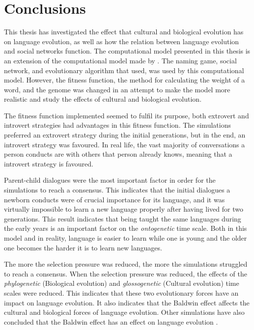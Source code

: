 \acresetall
\chapter{Conclusions}
This thesis has investigated the effect that cultural and biological evolution has on language evolution, as well as how the relation between language evolution and social networks function. The computational model presented in this thesis is an extension of the computational model made by \citet{lekvam2014co}. The naming game, social network, and evolutionary algorithm that \citeauthor{lekvam2014co} used, was used by this computational model. However, the fitness function, the method for calculating the weight of a word, and the genome was changed in an attempt to make the model more realistic and study the effects of cultural and biological evolution.
 
The fitness function implemented seemed to fulfil its purpose, both extrovert and introvert strategies had advantages in this fitness function. The simulations preferred an extrovert strategy during the initial generations, but in the end, an introvert strategy was favoured. In real life, the vast majority of conversations a person conducts are with others that person already knows, meaning that a introvert strategy is favoured.
 
Parent-child dialogues were the most important factor in order for the simulations to reach a consensus. This indicates that the initial dialogues a newborn conducts were of crucial importance for its language, and it was virtually impossible to learn a new language properly after having lived for two generations. This result indicates that being taught the same languages during the early years is an important factor on the \textit{ontogenetic} time scale. Both in this model and in reality, language is easier to learn while one is young and the older one becomes the harder it is to learn new languages.
 
The more the selection pressure was reduced, the more the simulations struggled to reach a consensus. When the selection pressure was reduced, the effects of the \textit{phylogenetic} (Biological evolution) and \textit{glossogenetic} (Cultural evolution) time scales were reduced. This indicates that these two evolutionary forces have an impact on language evolution. It also indicates that the Baldwin effect \citep{baldwin1896new} affects the cultural and biological forces of language evolution. Other simulations have also concluded that the Baldwin effect has an effect on language evolution \citep{lipowska2011naming, zollman2010plasticity, chater2010language}.


